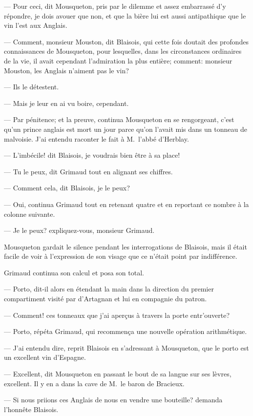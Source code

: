 — Pour ceci, dit Mousqueton, pris par le dilemme et assez embarrassé d'y répondre, je dois avouer que non, et que la bière lui est aussi antipathique que le vin l'est aux Anglais.

— Comment, monsieur Mouston, dit Blaisois, qui cette fois doutait des profondes connaissances de Mousqueton, pour lesquelles, dans les circonstances ordinaires de la vie, il avait cependant l'admiration la plus entière; comment: monsieur Mouston, les Anglais n'aiment pas le vin?

— Ils le détestent.

— Mais je leur en ai vu boire, cependant.

— Par pénitence; et la preuve, continua Mousqueton en se rengorgeant, c'est qu'un prince anglais est mort un jour parce qu'on l'avait mis dans un tonneau de malvoisie. J'ai entendu raconter le fait à M.~l'abbé d'Herblay.

— L'imbécile! dit Blaisois, je voudrais bien être à sa place!

— Tu le peux, dit Grimaud tout en alignant ses chiffres.

— Comment cela, dit Blaisois, je le peux?

— Oui, continua Grimaud tout en retenant quatre et en reportant ce nombre à la colonne suivante.

— Je le peux? expliquez-vous, monsieur Grimaud.

Mousqueton gardait le silence pendant les interrogations de Blaisois, mais il était facile de voir à l'expression de son visage que ce n'était point par indifférence.

Grimaud continua son calcul et posa son total.

— Porto, dit-il alors en étendant la main dans la direction du premier compartiment visité par d'Artagnan et lui en compagnie du patron.

— Comment! ces tonneaux que j'ai aperçus à travers la porte entr'ouverte?

— Porto, répéta Grimaud, qui recommença une nouvelle opération arithmétique.

— J'ai entendu dire, reprit Blaisois en s'adressant à Mousqueton, que le porto est un excellent vin d'Espagne.

— Excellent, dit Mousqueton en passant le bout de sa langue sur ses lèvres, excellent. Il y en a dans la cave de M.~le baron de Bracieux.

— Si nous priions ces Anglais de nous en vendre une bouteille? demanda l'honnête Blaisois.

